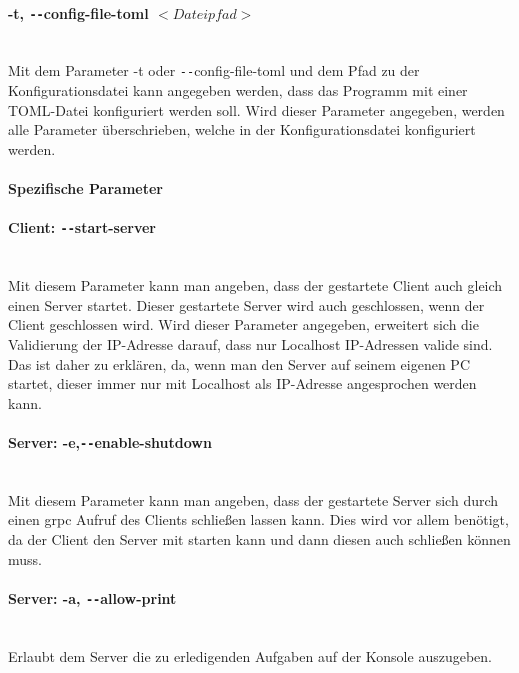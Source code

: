\paragraph{-t, \texttt{-{}-}config-file-toml $<Dateipfad>$} \mbox{} \vspace{2mm} \\
Mit dem Parameter -t oder \texttt{-{}-}config-file-toml und dem Pfad zu der Konfigurationsdatei kann angegeben werden, dass das Programm mit einer TOML-Datei konfiguriert werden soll. Wird dieser Parameter angegeben, werden alle Parameter überschrieben, welche in der Konfigurationsdatei konfiguriert werden.


\paragraph{Spezifische Parameter}


\paragraph{Client: \texttt{-{}-}start-server} \mbox{} \vspace{2mm} \\
Mit diesem Parameter kann man angeben, dass der gestartete Client auch gleich einen Server startet. Dieser gestartete Server wird auch geschlossen, wenn der Client geschlossen wird. Wird dieser Parameter angegeben, erweitert sich die Validierung der IP-Adresse darauf, dass nur Localhost IP-Adressen valide sind. Das ist daher zu erklären, da, wenn man den Server auf seinem eigenen PC startet, dieser immer nur mit Localhost als IP-Adresse angesprochen werden kann.


\paragraph{Server: -e,\texttt{-{}-}enable-shutdown} \mbox{} \vspace{2mm} \\
Mit diesem Parameter kann man angeben, dass der gestartete Server sich durch einen grpc Aufruf des Clients schließen lassen kann. Dies wird vor allem benötigt, da der Client den Server mit starten kann und dann diesen auch schließen können muss.

\paragraph{Server: -a, \texttt{-{}-}allow-print} \mbox{} \vspace{2mm} \\
Erlaubt dem Server die zu erledigenden Aufgaben auf der Konsole auszugeben.